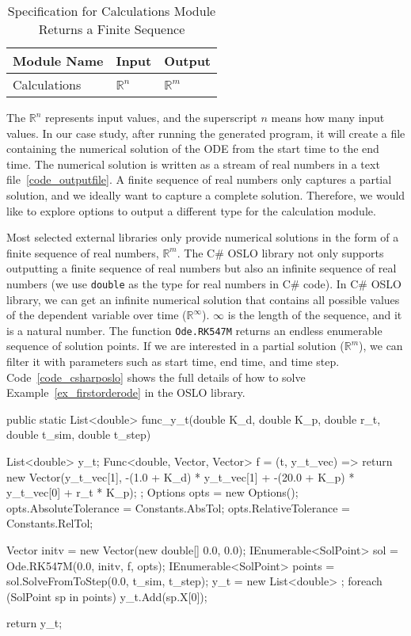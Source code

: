 \begin{table}[ht]
\centering
\begin{tabular}{p{} | p{} | p{}} \hline
    \textbf{Module Name}&\textbf{Input}&\textbf{Output}\\
    \toprule
    Calculations & $\mathbb{R}^n$ & $\mathbb{R}^m$ \\
    \bottomrule	
\end{tabular}	
\caption{Specification for Calculations Module Returns a Finite Sequence}	
\label{tab_srsforcal}
\end{table}
The $\mathbb{R}^n$ represents input values, and the superscript $n$ means how many input values. In our case study, after running the generated program, it will create a file containing the numerical solution of the ODE from the start time to the end time. The numerical solution is written as a stream of real numbers in a text file~\ref{code_outputfile}. A finite sequence of real numbers only captures a partial solution, and we ideally want to capture a complete solution. Therefore, we would like to explore options to output a different type for the calculation module.

Most selected external libraries only provide numerical solutions in the form of a finite sequence of real numbers, $\mathbb{R}^m$. The C\# OSLO library not only supports outputting a finite sequence of real numbers but also an infinite sequence of real numbers (we use \verb|double| as the type for real numbers in C\# code). In C\# OSLO library, we can get an infinite numerical solution that contains all possible values of the dependent variable over time ($\mathbb{R}^{\infty}$). $\infty$ is the length of the sequence, and it is a natural number. The function \verb|Ode.RK547M| returns an endless enumerable sequence of solution points. If we are interested in a partial solution ($\mathbb{R}^m$), we can filter it with parameters such as start time, end time, and time step. Code~\ref{code_csharposlo} shows the full details of how to solve Example~\ref{ex_firstorderode} in the OSLO library.
\begin{listing}[ht]
\begin{csharp1}
public static List<double> func_y_t(double K_d, double K_p, double r_t, double t_sim, double t_step) {
    List<double> y_t;
    Func<double, Vector, Vector> f = (t, y_t_vec) => {
        return new Vector(y_t_vec[1], -(1.0 + K_d) * y_t_vec[1] + -(20.0 + K_p) * y_t_vec[0] + r_t * K_p);
    };
    Options opts = new Options();
    opts.AbsoluteTolerance = Constants.AbsTol;
    opts.RelativeTolerance = Constants.RelTol;
    
    Vector initv = new Vector(new double[] {0.0, 0.0});
    IEnumerable<SolPoint> sol = Ode.RK547M(0.0, initv, f, opts);
    IEnumerable<SolPoint> points = sol.SolveFromToStep(0.0, t_sim, t_step);
    y_t = new List<double> {};
    foreach (SolPoint sp in points) {
        y_t.Add(sp.X[0]);
    }
    
    return y_t;
}
\end{csharp1}
\label{code_csharposlo}
\end{listing}

